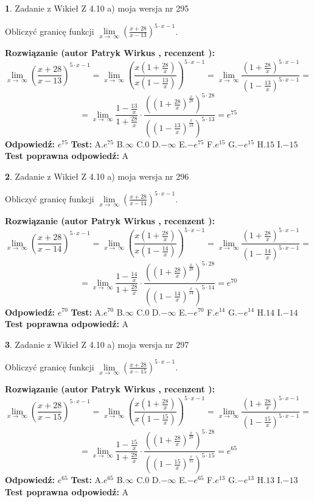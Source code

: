 \documentclass[12pt, a4paper]{article}
\theoremstyle{definition} %
\newtheorem{zad}{}
\newcommand{\zadStart}[1]{\begin{zad}#1\newline}
\newcommand{\zadStop}{\end{zad}}
\newcommand{\rozwStart}[2]{\noindent \textbf{Rozwiązanie (autor #1 , recenzent #2): }\newline}
\newcommand{\rozwStop}{\newline}
\newcommand{\odpStart}{\noindent \textbf{Odpowiedź:}\newline}
\newcommand{\odpStop}{\newline}
\newcommand{\testStart}{\noindent \textbf{Test:}\newline}
\newcommand{\testStop}{\newline}
\newcommand{\kluczStart}{\noindent \textbf{Test poprawna odpowiedź:}\newline}
\newcommand{\kluczStop}{\newline}
\begin{document}
\zadStart{Zadanie z Wikieł Z 4.10 a) moja wersja nr 295}

Obliczyć granicę funkcji  $\lim\limits_{x\to\ \infty}(\frac{x+28}{x-13})^{5\cdot x-1}$.
\zadStop
\rozwStart{Patryk Wirkus}{}
$$\lim\limits_{x\to\ \infty}(\frac{x+28}{x-13})^{5\cdot x-1} = \lim\limits_{x\to\ \infty}(\frac{x(1+\frac{28}{x})}{x(1-\frac{13}{x})})^{5\cdot x-1}=\lim\limits_{x\to\ \infty}\frac{(1+\frac{28}{x})^{5\cdot x-1}}{(1-\frac{13}{x})^{5\cdot x-1}}=$$
$$=\lim\limits_{x\to\ \infty}\frac{1-\frac{13}{x}}{1+\frac{28}{x}}\cdot\frac{((1+\frac{28}{x})^{\frac{x}{28}})^{5\cdot28}}{((1-\frac{13}{x})^{\frac{x}{13}})^{5\cdot13}}=e^{75}$$
\rozwStop
\odpStart
$e^{75}$
\odpStop
\testStart
A.$e^{75}$ B.$\infty$ C.$0$ D.$-\infty$ E.$-e^{75}$
F.$e^{15}$ G.$-e^{15}$
H.$15$
I.$-15$
\testStop
\kluczStart
A
\kluczStop



\zadStart{Zadanie z Wikieł Z 4.10 a) moja wersja nr 296}

Obliczyć granicę funkcji  $\lim\limits_{x\to\ \infty}(\frac{x+28}{x-14})^{5\cdot x-1}$.
\zadStop
\rozwStart{Patryk Wirkus}{}
$$\lim\limits_{x\to\ \infty}(\frac{x+28}{x-14})^{5\cdot x-1} = \lim\limits_{x\to\ \infty}(\frac{x(1+\frac{28}{x})}{x(1-\frac{14}{x})})^{5\cdot x-1}=\lim\limits_{x\to\ \infty}\frac{(1+\frac{28}{x})^{5\cdot x-1}}{(1-\frac{14}{x})^{5\cdot x-1}}=$$
$$=\lim\limits_{x\to\ \infty}\frac{1-\frac{14}{x}}{1+\frac{28}{x}}\cdot\frac{((1+\frac{28}{x})^{\frac{x}{28}})^{5\cdot28}}{((1-\frac{14}{x})^{\frac{x}{14}})^{5\cdot14}}=e^{70}$$
\rozwStop
\odpStart
$e^{70}$
\odpStop
\testStart
A.$e^{70}$ B.$\infty$ C.$0$ D.$-\infty$ E.$-e^{70}$
F.$e^{14}$ G.$-e^{14}$
H.$14$
I.$-14$
\testStop
\kluczStart
A
\kluczStop



\zadStart{Zadanie z Wikieł Z 4.10 a) moja wersja nr 297}

Obliczyć granicę funkcji  $\lim\limits_{x\to\ \infty}(\frac{x+28}{x-15})^{5\cdot x-1}$.
\zadStop
\rozwStart{Patryk Wirkus}{}
$$\lim\limits_{x\to\ \infty}(\frac{x+28}{x-15})^{5\cdot x-1} = \lim\limits_{x\to\ \infty}(\frac{x(1+\frac{28}{x})}{x(1-\frac{15}{x})})^{5\cdot x-1}=\lim\limits_{x\to\ \infty}\frac{(1+\frac{28}{x})^{5\cdot x-1}}{(1-\frac{15}{x})^{5\cdot x-1}}=$$
$$=\lim\limits_{x\to\ \infty}\frac{1-\frac{15}{x}}{1+\frac{28}{x}}\cdot\frac{((1+\frac{28}{x})^{\frac{x}{28}})^{5\cdot28}}{((1-\frac{15}{x})^{\frac{x}{15}})^{5\cdot15}}=e^{65}$$
\rozwStop
\odpStart
$e^{65}$
\odpStop
\testStart
A.$e^{65}$ B.$\infty$ C.$0$ D.$-\infty$ E.$-e^{65}$
F.$e^{13}$ G.$-e^{13}$
H.$13$
I.$-13$
\testStop
\kluczStart
A
\kluczStop
\end{document}
